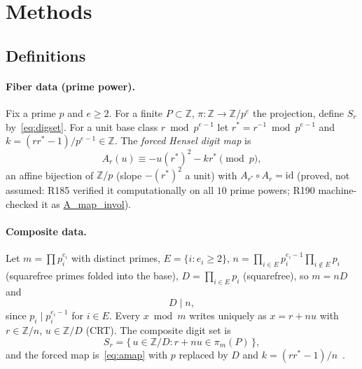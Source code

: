\documentclass[11pt,a4paper]{article}
\theoremstyle{definition}
\begin{document}
\section{Methods}

\subsection{Definitions}

\paragraph{Fiber data (prime power).}
Fix a prime $p$ and $e\ge2$. For a finite $P\subset\mathbb{Z}$,
$\pi:\mathbb{Z}\to\mathbb{Z}/p^e$ the projection, define $S_r$
by~\eqref{eq:digset}. For a unit base class $r\bmod p^{e-1}$ let
$r^*=r^{-1}\bmod p^{e-1}$ and
$k=(rr^*-1)/p^{e-1}\in\mathbb{Z}$. The \emph{forced Hensel digit map} is
\begin{equation}
  \label{eq:amap}
  A_r(u)\equiv -u(r^*)^2-kr^*\pmod p,
\end{equation}
an affine bijection of $\mathbb{Z}/p$ (slope $-(r^*)^2$ a unit) with
$A_{r^*}\circ A_r=\mathrm{id}$ (proved, not assumed: R185 verified it
computationally on all $10$ prime powers; R190 machine-checked it as
\url{A_map_invol}).

\paragraph{Composite data.}
Let $m=\prod p_i^{e_i}$ with distinct primes, $E=\{i:e_i\ge2\}$,
$n=\prod_{i\in E}p_i^{e_i-1}\prod_{i\notin E}p_i$ (squarefree primes folded
into the base), $D=\prod_{i\in E}p_i$ (squarefree), so $m=nD$ and
\begin{equation}
  \label{eq:dn}
  D\mid n,
\end{equation}
since $p_i\mid p_i^{e_i-1}$ for $i\in E$. Every $x\bmod m$ writes uniquely
as $x=r+nu$ with $r\in\mathbb{Z}/n$, $u\in\mathbb{Z}/D$ (CRT).
The composite digit set is
\begin{equation}
  \label{eq:digsetC}
  S_r=\{\,u\in\mathbb{Z}/D:r+nu\in\pi_m(P)\,\},
\end{equation}
and the forced map is~\eqref{eq:amap} with $p$ replaced by $D$ and
$k=(rr^*-1)/n$~\cite{D192}.
\end{document}
